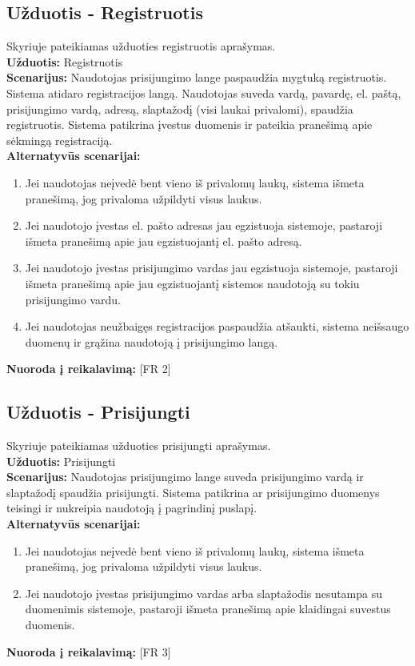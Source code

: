 \documentclass{VUMIFPSkursinis}
\begin{document}
	\subsection{Užduotis - Registruotis}
	Skyriuje pateikiamas užduoties registruotis aprašymas.\\
	\textbf{Užduotis:}  Registruotis \\
	\textbf{Scenarijus:} Naudotojas prisijungimo lange paspaudžia mygtuką registruotis. Sistema atidaro registracijos langą. Naudotojas suveda vardą, pavardę, el. paštą, prisijungimo vardą, adresą, slaptažodį (visi laukai privalomi), spaudžia registruotis. Sistema patikrina įvestus duomenis ir pateikia pranešimą apie sėkmingą registraciją.\\
	\textbf{Alternatyvūs scenarijai:}
	\begin{enumerate}
		\item Jei naudotojas neįvedė bent vieno iš privalomų laukų, sistema išmeta pranešimą, jog privaloma užpildyti visus laukus.
		\item Jei naudotojo įvestas el. pašto adresas jau egzistuoja sistemoje, pastaroji išmeta pranešimą apie jau egzistuojantį el. pašto adresą.
		\item Jei naudotojo įvestas prisijungimo vardas jau egzistuoja sistemoje, pastaroji išmeta pranešimą apie jau egzistuojantį sistemos naudotoją su tokiu prisijungimo vardu.
		\item Jei naudotojas neužbaigęs registracijos paspaudžia atšaukti, sistema neišsaugo duomenų ir grąžina naudotoją į prisijungimo langą.
	\end{enumerate}
	\textbf{Nuoroda į reikalavimą: } [FR 2]\\

	\subsection{Užduotis - Prisijungti}
	Skyriuje pateikiamas užduoties prisijungti aprašymas.\\
	\textbf{Užduotis:}  Prisijungti \\
	\textbf{Scenarijus:} Naudotojas prisijungimo lange suveda prisijungimo vardą ir slaptažodį spaudžia prisijungti. Sistema patikrina ar prisijungimo duomenys teisingi ir nukreipia naudotoją į pagrindinį puslapį. \\
	\textbf{Alternatyvūs scenarijai:}
	\begin{enumerate}
		\item Jei naudotojas neįvedė bent vieno iš privalomų laukų, sistema išmeta pranešimą, jog privaloma užpildyti visus laukus.
		\item Jei naudotojo įvestas prisijungimo vardas arba slaptažodis nesutampa su duomenimis sistemoje, pastaroji išmeta pranešimą apie klaidingai suvestus duomenis.
	\end{enumerate}
	\textbf{Nuoroda į reikalavimą: } [FR 3]
\end{document}
